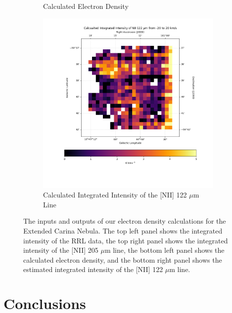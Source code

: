 \begin{figure}
\begin{subfigure}[t]{0.45\textwidth}
        \caption{Calculated Electron Density}
    \end{subfigure}
    \begin{subfigure}[t]{0.45\textwidth}
        \centering
        \includegraphics[width=\textwidth]{figs/carina/carina/122.png}
        \caption{Calculated Integrated Intensity of the [NII] 122 $\mu$m Line}
    \end{subfigure}
    \caption[Calculated Electron Density and {[}NII{]} 122 $\mu$m Maps for the Keyhole Nebula]{
        The inputs and outputs of our electron density calculations for the Extended Carina Nebula.
        The top left panel shows the integrated intensity of the RRL data, the top right panel shows the integrated intensity of the [NII] 205 $\mu$m line, the bottom left panel shows the calculated electron density, and the bottom right panel shows the estimated integrated intensity of the [NII] 122 $\mu$m line.
        }
    \label{carina/fig:result_carina}
\end{figure}

\section{Conclusions}
